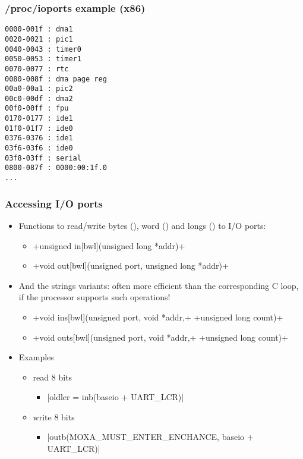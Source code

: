 \begin{frame}[fragile]
  \frametitle{/proc/ioports example (x86)}
{\small
\begin{verbatim}
0000-001f : dma1
0020-0021 : pic1
0040-0043 : timer0
0050-0053 : timer1
0070-0077 : rtc
0080-008f : dma page reg
00a0-00a1 : pic2
00c0-00df : dma2
00f0-00ff : fpu
0170-0177 : ide1
01f0-01f7 : ide0
0376-0376 : ide1
03f6-03f6 : ide0
03f8-03ff : serial
0800-087f : 0000:00:1f.0
...
\end{verbatim}
}
\end{frame}

\begin{frame}[fragile]
  \frametitle{Accessing I/O ports}
  \begin{itemize}
  \item Functions to read/write bytes (), word () and longs () to I/O ports:
    \begin{itemize}
    \item {}+unsigned in[bwl](unsigned long *addr)+
    \item {}+void out[bwl](unsigned port, unsigned long *addr)+
    \end{itemize}
  \item And the strings variants: often more efficient than the
    corresponding C loop, if the processor supports such operations!
    \begin{itemize}
    \item {}+void ins[bwl](unsigned port, void *addr,+
      +unsigned long count)+
    \item {}+void outs[bwl](unsigned port, void *addr,+
      +unsigned long count)+
    \end{itemize}
  \item Examples
    \begin{itemize}
    \item read 8 bits
      \begin{itemize}
      \item {}|oldlcr = inb(baseio + UART_LCR)|
      \end{itemize}
    \item write 8 bits
      \begin{itemize}
      \item {}|outb(MOXA_MUST_ENTER_ENCHANCE, baseio + UART_LCR)|
      \end{itemize}
    \end{itemize}
  \end{itemize}
\end{frame}

